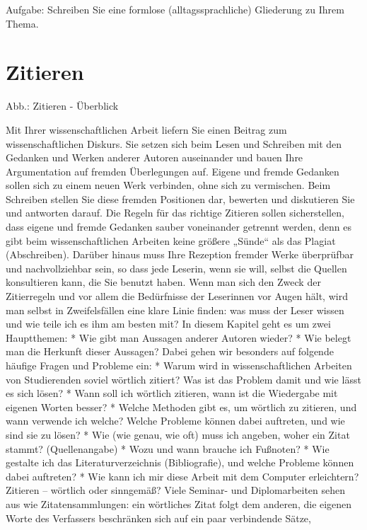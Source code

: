 \documentclass[]{book}
\theoremstyle{definition}
\theoremstyle{definition}
\theoremstyle{definition}
\theoremstyle{remark}
\begin{document}
Aufgabe: Schreiben Sie eine formlose (alltagssprachliche) Gliederung zu
Ihrem Thema.

\chapter{Zitieren}\label{zitieren}

Abb.: Zitieren - Überblick

Mit Ihrer wissenschaftlichen Arbeit liefern Sie einen Beitrag zum
wissenschaftlichen Diskurs. Sie setzen sich beim Lesen und Schreiben mit
den Gedanken und Werken anderer Autoren auseinander und bauen Ihre
Argumentation auf fremden Überlegungen auf. Eigene und fremde Gedanken
sollen sich zu einem neuen Werk verbinden, ohne sich zu vermischen. Beim
Schreiben stellen Sie diese fremden Positionen dar, bewerten und
diskutieren Sie und antworten darauf. Die Regeln für das richtige
Zitieren sollen sicherstellen, dass eigene und fremde Gedanken sauber
voneinander getrennt werden, denn es gibt beim wissenschaftlichen
Arbeiten keine größere „Sünde`` als das Plagiat (Abschreiben). Darüber
hinaus muss Ihre Rezeption fremder Werke überprüfbar und nachvollziehbar
sein, so dass jede Leserin, wenn sie will, selbst die Quellen
konsultieren kann, die Sie benutzt haben. Wenn man sich den Zweck der
Zitierregeln und vor allem die Bedürfnisse der Leserinnen vor Augen
hält, wird man selbst in Zweifelsfällen eine klare Linie finden: was
muss der Leser wissen und wie teile ich es ihm am besten mit? In diesem
Kapitel geht es um zwei Hauptthemen: * Wie gibt man Aussagen anderer
Autoren wieder? * Wie belegt man die Herkunft dieser Aussagen? Dabei
gehen wir besonders auf folgende häufige Fragen und Probleme ein: *
Warum wird in wissenschaftlichen Arbeiten von Studierenden soviel
wörtlich zitiert? Was ist das Problem damit und wie lässt es sich lösen?
* Wann soll ich wörtlich zitieren, wann ist die Wiedergabe mit eigenen
Worten besser? * Welche Methoden gibt es, um wörtlich zu zitieren, und
wann verwende ich welche? Welche Probleme können dabei auftreten, und
wie sind sie zu lösen? * Wie (wie genau, wie oft) muss ich angeben,
woher ein Zitat stammt? (Quellenangabe) * Wozu und wann brauche ich
Fußnoten? * Wie gestalte ich das Literaturverzeichnis (Bibliografie),
und welche Probleme können dabei auftreten? * Wie kann ich mir diese
Arbeit mit dem Computer erleichtern? Zitieren -- wörtlich oder
sinngemäß? Viele Seminar- und Diplomarbeiten sehen aus wie
Zitatensammlungen: ein wörtliches Zitat folgt dem anderen, die eigenen
Worte des Verfassers beschränken sich auf ein paar verbindende Sätze,
\end{document}

